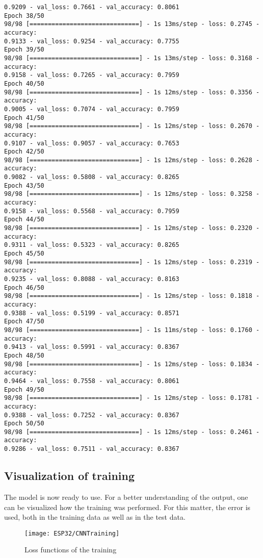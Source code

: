 \begin{verbatim}
0.9209 - val_loss: 0.7661 - val_accuracy: 0.8061
Epoch 38/50
98/98 [==============================] - 1s 13ms/step - loss: 0.2745 - accuracy:
0.9133 - val_loss: 0.9254 - val_accuracy: 0.7755
Epoch 39/50
98/98 [==============================] - 1s 13ms/step - loss: 0.3168 - accuracy:
0.9158 - val_loss: 0.7265 - val_accuracy: 0.7959
Epoch 40/50
98/98 [==============================] - 1s 12ms/step - loss: 0.3356 - accuracy:
0.9005 - val_loss: 0.7074 - val_accuracy: 0.7959
Epoch 41/50
98/98 [==============================] - 1s 12ms/step - loss: 0.2670 - accuracy:
0.9107 - val_loss: 0.9057 - val_accuracy: 0.7653
Epoch 42/50
98/98 [==============================] - 1s 12ms/step - loss: 0.2628 - accuracy:
0.9082 - val_loss: 0.5808 - val_accuracy: 0.8265
Epoch 43/50
98/98 [==============================] - 1s 12ms/step - loss: 0.3258 - accuracy:
0.9158 - val_loss: 0.5568 - val_accuracy: 0.7959
Epoch 44/50
98/98 [==============================] - 1s 12ms/step - loss: 0.2320 - accuracy:
0.9311 - val_loss: 0.5323 - val_accuracy: 0.8265
Epoch 45/50
98/98 [==============================] - 1s 12ms/step - loss: 0.2319 - accuracy:
0.9235 - val_loss: 0.8088 - val_accuracy: 0.8163
Epoch 46/50
98/98 [==============================] - 1s 12ms/step - loss: 0.1818 - accuracy:
0.9388 - val_loss: 0.5199 - val_accuracy: 0.8571
Epoch 47/50
98/98 [==============================] - 1s 11ms/step - loss: 0.1760 - accuracy:
0.9413 - val_loss: 0.5991 - val_accuracy: 0.8367
Epoch 48/50
98/98 [==============================] - 1s 12ms/step - loss: 0.1834 - accuracy:
0.9464 - val_loss: 0.7558 - val_accuracy: 0.8061
Epoch 49/50
98/98 [==============================] - 1s 12ms/step - loss: 0.1781 - accuracy:
0.9388 - val_loss: 0.7252 - val_accuracy: 0.8367
Epoch 50/50
98/98 [==============================] - 1s 12ms/step - loss: 0.2461 - accuracy:
0.9286 - val_loss: 0.7511 - val_accuracy: 0.8367
\end{verbatim}

\subsection{Visualization of training}

The model is now ready to use. For a better understanding of the output, one can be visualized how the training was performed. For this matter, the error is used, both in the training data as well as in the test data.


\begin{figure}  
    \begin{center}
        \texttt{[image: ESP32/CNNTraining]}
        \caption{Loss functions of the training} 
        \label{ESP32fig:Lossfunctions}
    \end{center}
\end{figure}


